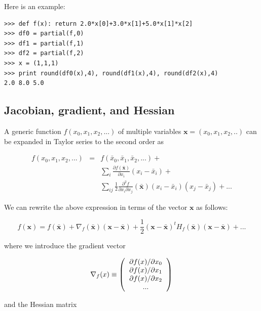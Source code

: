 \documentclass[justified,sixbynine]{tufte-book}
\def\ft{\small\tt}
\theoremstyle{plain}%
\theoremstyle{definition}
\theoremstyle{remark}
\begin{document}
\begin{fullwidth}
Here is an example:

\begin{lstlisting}[caption={in file: {\ft nlib.py}}]
>>> def f(x): return 2.0*x[0]+3.0*x[1]+5.0*x[1]*x[2]
>>> df0 = partial(f,0)
>>> df1 = partial(f,1)
>>> df2 = partial(f,2)
>>> x = (1,1,1)
>>> print round(df0(x),4), round(df1(x),4), round(df2(x),4)
2.0 8.0 5.0
\end{lstlisting}

\goodbreak\subsection{Jacobian, gradient, and Hessian}


A generic function $f(x_0,x_1,x_2,...)$ of multiple variables $\mathbf{x}=(x_0,x_1,x_2,..)$ can be expanded in Taylor series to the second order as

\begin{eqnarray}
f(x_0,x_1,x_2,...) &=& f(\bar x_0,\bar x_1, \bar x_2,...) + \\
&& \sum_i \frac{\partial f(\mathbf{\bar x})}{\partial x_i}(x_i-\bar x_i) + \\
&& \sum_{ij} \frac12 \frac{\partial^2 f}{\partial x_i\partial x_j}(\mathbf{\bar x})(x_i-\bar x_i)(x_j-\bar x_j) + ...
\end{eqnarray}

We can rewrite the above expression in terms of the vector $\mathbf{x}$ as follows:

\begin{equation}
f(\mathbf{x}) = f(\mathbf{\bar x}) + \nabla_f(\mathbf{\bar x})(\mathbf{x}-\mathbf{\bar x})
+ \frac12 (\mathbf{x}-\mathbf{\bar x})^t H_f(\mathbf{\bar x})(\mathbf{x}-\mathbf{\bar x}) + ...
\end{equation}

where we introduce the gradient vector

\begin{equation}
\nabla_f(x) \equiv \left(
\begin{tabular}{c}
$\partial f(x)/\partial x_0$ \\
$\partial f(x)/\partial x_1$ \\
$\partial f(x)/\partial x_2$ \\
...
\end{tabular}
\right)
\end{equation}

and the Hessian matrix


\end{fullwidth}
\end{document}
